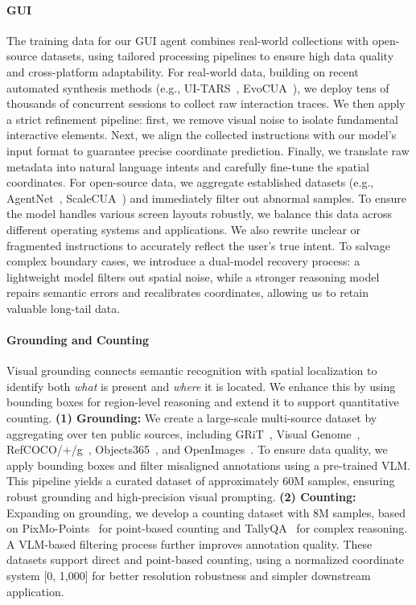 \documentclass{article}
\begin{document}
\paragraph{GUI} 
The training data for our GUI agent combines real-world collections with open-source datasets, using tailored processing pipelines to ensure high data quality and cross-platform adaptability. For real-world data, building on recent automated synthesis methods (e.g., UI-TARS~\cite{qin2025ui}, EvoCUA~\cite{xue2026evocua}), we deploy tens of thousands of concurrent sessions to collect raw interaction traces. We then apply a strict refinement pipeline: first, we remove visual noise to isolate fundamental interactive elements. Next, we align the collected instructions with our model's input format to guarantee precise coordinate prediction. Finally, we translate raw metadata into natural language intents and carefully fine-tune the spatial coordinates. For open-source data, we aggregate established datasets (e.g., AgentNet~\cite{wang2025opencua}, ScaleCUA~\cite{liu2025scalecua}) and immediately filter out abnormal samples. To ensure the model handles various screen layouts robustly, we balance this data across different operating systems and applications. We also rewrite unclear or fragmented instructions to accurately reflect the user's true intent. To salvage complex boundary cases, we introduce a dual-model recovery process: a lightweight model filters out spatial noise, while a stronger reasoning model repairs semantic errors and recalibrates coordinates, allowing us to retain valuable long-tail data.



\paragraph{Grounding and Counting}
Visual grounding connects semantic recognition with spatial localization to identify both \textit{what} is present and \textit{where} it is located. We enhance this by using bounding boxes for region-level reasoning and extend it to support quantitative counting. \textbf{(1) Grounding:}
We create a large-scale multi-source dataset by aggregating over ten public sources, including GRiT~\cite{peng2023kosmos}, Visual Genome~\cite{krishna2017visual}, RefCOCO/+/g~\cite{kazemzadeh2014referitgame, nagaraja2016modeling, yu2016modeling}, Objects365~\cite{shao2019objects365}, and OpenImages~\cite{kuznetsova2020open}. To ensure data quality, we apply bounding boxes and filter misaligned annotations using a pre-trained VLM. This pipeline yields a curated dataset of approximately 60M samples, ensuring robust grounding and high-precision visual prompting. \textbf{(2) Counting:}
Expanding on grounding, we develop a counting dataset with 8M samples, based on PixMo-Points~\cite{deitke2025molmo} for point-based counting and TallyQA~\cite{acharya2019tallyqa} for complex reasoning. A VLM-based filtering process further improves annotation quality. These datasets support direct and point-based counting, using a normalized coordinate system [0, 1,000] for better resolution robustness and simpler downstream application.
\end{document}
